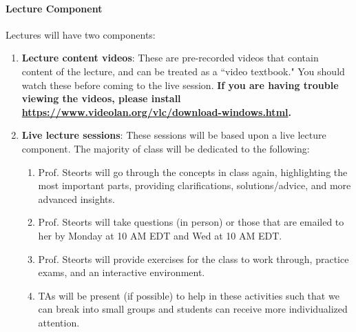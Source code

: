 \documentclass[11pt]{article}
\begin{document}
\paragraph{Lecture Component}
Lectures will have two components: 
\begin{enumerate}
\item \textbf{Lecture content videos}: These are pre-recorded videos that contain content of the lecture, and can be treated as a ``video textbook." You should watch these before coming to the live session. \textbf{If you are having trouble viewing the videos, please install \url{https://www.videolan.org/vlc/download-windows.html}.}
\item \textbf{Live lecture sessions}: These sessions will be based upon a live lecture component. 
The majority of class will be dedicated to the following:
\begin{enumerate}
\item Prof. Steorts will go through the concepts in class again, highlighting the most important parts, providing clarifications, solutions/advice, and more advanced insights. 
\item Prof. Steorts will take questions (in person) or those that are emailed to her by Monday at 10 AM EDT and Wed at 10 AM EDT. 
\item Prof. Steorts will provide exercises for the class to work through, practice exams, and an interactive environment. 
\item TAs will be present (if possible) to help in these activities such that we can break into small groups and students can receive more individualized attention. 
\end{enumerate} 
\end{enumerate}
\end{document}

